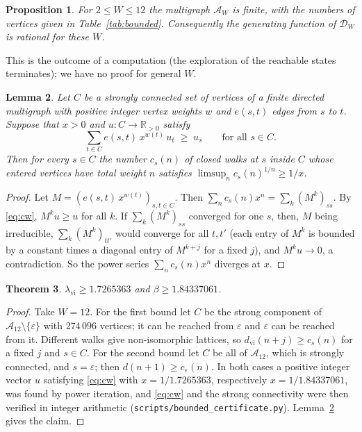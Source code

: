 \documentclass[11pt]{amsart}
\newtheorem{theorem}{Theorem}[section]
\newtheorem{lemma}[theorem]{Lemma}
\newtheorem{proposition}[theorem]{Proposition}
\theoremstyle{definition}
\theoremstyle{remark}
\begin{document}
\begin{proposition}\label{prop:finite}
For $2 \le W \le 12$ the multigraph $\mathcal{A}_W$ is finite, with the numbers of vertices
given in Table~\ref{tab:bounded}.  Consequently the generating function of $\mathcal{D}_W$ is
rational for these $W$.
\end{proposition}

This is the outcome of a computation (the exploration of the reachable states terminates); we
have no proof for general $W$.

\begin{lemma}\label{lem:cw}
Let $C$ be a strongly connected set of vertices of a finite directed multigraph with positive
integer vertex weights $w$ and $e(s,t)$ edges from $s$ to $t$.  Suppose that $x > 0$ and
$u \colon C \to \mathbb{R}_{>0}$ satisfy
\begin{equation}\label{eq:cw}
  \sum_{t \in C} e(s,t)\, x^{w(t)}\, u_t \;\ge\; u_s \qquad\text{for all } s \in C .
\end{equation}
Then for every $s \in C$ the number $c_s(n)$ of closed walks at $s$ inside $C$ whose entered
vertices have total weight $n$ satisfies $\limsup_n c_s(n)^{1/n} \ge 1/x$.
\end{lemma}

\begin{proof}
Let $M = (e(s,t)\,x^{w(t)})_{s,t \in C}$.  Then $\sum_n c_s(n) x^n = \sum_k (M^k)_{ss}$.  By
\eqref{eq:cw}, $M^k u \ge u$ for all $k$.  If $\sum_k (M^k)_{ss}$ converged for one $s$, then,
$M$ being irreducible, $\sum_k (M^k)_{tt'}$ would converge for all $t,t'$ (each entry of
$M^k$ is bounded by a constant times a diagonal entry of $M^{k+j}$ for a fixed $j$), and
$M^k u \to 0$, a contradiction.  So the power series $\sum_n c_s(n)x^n$ diverges at $x$.
\end{proof}

\begin{theorem}\label{thm:growth}
$\lambda_{\mathrm{vi}} \ge 1.7265363$ and $\beta \ge 1.84337061$.
\end{theorem}

\begin{proof}
Take $W = 12$.  For the first bound let $C$ be the strong component of
$\mathcal{A}_{12} \setminus \{\varepsilon\}$ with $274\,096$ vertices; it can be reached from
$\varepsilon$ and $\varepsilon$ can be reached from it.  Different walks give non-isomorphic
lattices, so $d_{\mathrm{vi}}(n + j) \ge c_s(n)$ for a fixed $j$ and $s \in C$.  For the second
bound let $C$ be all of $\mathcal{A}_{12}$, which is strongly connected, and $s = \varepsilon$;
then $d(n+1) \ge c_\varepsilon(n)$.  In both cases a positive integer vector $u$ satisfying
\eqref{eq:cw} with $x = 1/1.7265363$, respectively $x = 1/1.84337061$, was found by power
iteration, and \eqref{eq:cw} and the strong connectivity were then verified in integer
arithmetic (\texttt{scripts/bounded\_certificate.py}).  Lemma~\ref{lem:cw} gives the claim.
\end{proof}
\end{document}

